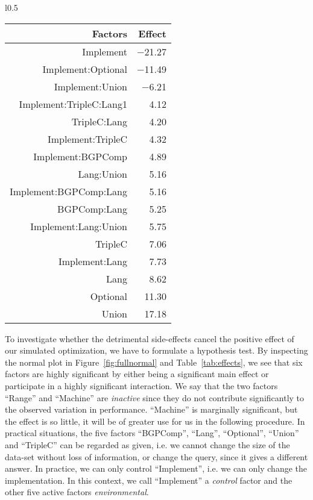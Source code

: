\documentclass{llncs}
\begin{document}
\begin{wraptable}{l}{0.5\textwidth}
\caption{The magnitude of effects for some important main effects and interactions.}\label{tab:effects}
\medskip
\begin{tabular}{rr}
  \hline
Factors & Effect  \\ 
  \hline
Implement & $-$21.27 \\ 
  Implement:Optional & $-$11.49 \\ 
  Implement:Union & $-$6.21 \\ 
  Implement:TripleC:Lang1 & 4.12 \\ 
  TripleC:Lang & 4.20 \\ 
  Implement:TripleC & 4.32 \\ 
  Implement:BGPComp & 4.89 \\ 
  Lang:Union & 5.16 \\ 
  Implement:BGPComp:Lang & 5.16 \\ 
  BGPComp:Lang & 5.25 \\ 
  Implement:Lang:Union & 5.75 \\ 
  TripleC & 7.06 \\ 
  Implement:Lang & 7.73 \\ 
  Lang & 8.62 \\ 
  Optional & 11.30 \\ 
  Union & 17.18 \\ 
   \hline
\end{tabular}
\end{wraptable}

To investigate whether the detrimental side-effects cancel the
positive effect of our simulated optimization, we have to formulate a
hypothesis test. By inspecting the normal plot in
Figure~\ref{fig:fullnormal} and Table~\ref{tab:effects}, we see that
six factors are highly significant by either being a significant main
effect or participate in a highly significant interaction. We say that
the two factors ``Range'' and ``Machine'' are \emph{inactive} since
they do not contribute significantly to the observed variation in
performance. ``Machine'' is marginally significant, but the effect is
so little, it will be of greater use for us in the following procedure. In
practical situations, the five factors ``BGPComp'', ``Lang'',
``Optional'', ``Union'' and ``TripleC'' can be regarded as given,
i.e. we cannot change the size of the data-set without loss of
information, or change the query, since it gives a different
answer. In practice, we can only control ``Implement'', i.e. we can
only change the implementation. In this context, we call ``Implement''
a \emph{control} factor and the other five active factors
\emph{environmental}.
\end{document}
